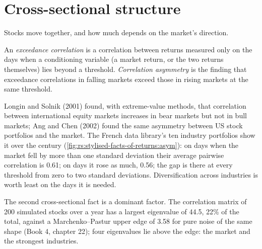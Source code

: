 \section{Cross-sectional structure}

Stocks move together, and how much depends on the market's direction.

\begin{definition}\label{def:rs:stylised-facts-of-returns:exceedance}
An \emph{exceedance correlation} is a correlation between returns measured only on the days when a
conditioning variable (a market return, or the two returns themselves) lies beyond a threshold. \emph{Correlation
asymmetry} is the finding that exceedance correlations in falling markets exceed those in rising
markets at the same threshold.
\end{definition}

Longin and Solnik (2001) found, with extreme-value methods, that correlation between international equity markets increases in bear
markets but not in bull markets; Ang and Chen (2002) found the same asymmetry between US stock portfolios and the market. The
French data library's ten industry portfolios show it over the century (\cref{fig:rs:stylised-facts-of-returns:asym}): on days when
the market fell by more than one standard deviation their average pairwise correlation is 0.61; on days it rose as much, 0.56; the
gap is there at every threshold from zero to two standard deviations. Diversification across industries is worth least on the days
it is needed.

The second cross-sectional fact is a dominant factor. The correlation matrix of 200 simulated stocks over a year has a largest
eigenvalue of 44.5, 22\% of the total, against a Marchenko--Pastur upper edge of 3.58 for pure noise of the same shape (Book 4,
chapter 22); four eigenvalues lie above the edge: the market and the strongest industries.

